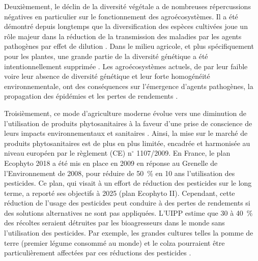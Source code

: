 
	Deuxièmement,  le déclin de la diversité végétale a de nombreuses répercussions négatives en particulier sur le fonctionnement des agroécosystèmes. Il a été démontré depuis longtemps que  la diversification des espèces cultivées joue un rôle majeur dans  la réduction de la transmission des maladies par les agents pathogènes par  \og effet de dilution \fg{} \citep{Mundt1994, Mundt2002, Keesing2006}.  Dans le milieu agricole, et plus spécifiquement pour les plantes,  une grande partie de la diversité génétique  a été intentionnellement supprimée  \citep{Brown2015}.
	Les agroécosystèmes actuels, de par leur faible voire leur absence de diversité génétique et leur forte homogénéité environnementale, ont des conséquences sur l’émergence d'agents pathogènes, la propagation des épidémies et les pertes de rendements \citep{Brown2015, Zhan2015, Stukenbrock2008}. 

	Troisièmement,  ce mode d'agriculture moderne  évolue vers une   diminution  de l'utilisation de produits phytosanitaires à la faveur d’une prise de conscience de leurs impacts environnementaux et sanitaires \citep{Carvalho2006, Palumbi2001, Geiger2010}. Ainsi, la mise sur le marché de produits phytosanitaires  est de plus en plus limitée, encadrée et harmonisée au niveau européen par le règlement (CE) n$^{\circ}$  1107/2009.  En France, le plan Ecophyto 2018  a été mis en place en 2009 en réponse au Grenelle de l’Environnement de 2008, pour réduire de 50~\%  en 10 ans  l’utilisation des pesticides. Ce plan, qui visait à un effort de réduction des pesticides sur le long terme, a reporté ses objectifs à 2025 (plan Ecophyto II). Cependant, cette réduction de l’usage des pesticides  peut conduire à des pertes de rendements si des solutions alternatives ne sont pas appliquées. L'\gls{UIPP}  estime que 30 à 40~\% des récoltes seraient détruites par les bioagresseurs dans le monde sans l'utilisation des pesticides.   
Par exemple,  les grandes cultures telles la pomme de terre (premier légume consommé au monde) et le colza   pourraient  être particulièrement  affectées par ces réductions des pesticides  \citep{Butault2010,  Schmidt2010}. 


